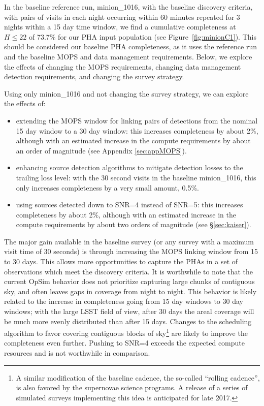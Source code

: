 In the baseline reference run, minion\_1016, with the baseline discovery criteria, with pairs of visits in each night occurring within 60 minutes repeated for 3 nights within a 15 day time window, we find a cumulative completeness at $H\le22$ of 73.7\% for our PHA input population (see Figure~\ref{fig:minionC1}). This should be considered our baseline PHA completeness, as it uses the reference run and the baseline MOPS and data management requirements. Below, we explore the effects of changing the MOPS requirements, changing data management detection requirements, and changing the survey strategy.

Using only minion\_1016 and not changing the survey strategy, we can explore the effects of:
\begin{itemize}
\item extending the MOPS window for linking pairs of detections from the nominal 15 day window to a 30 day window: this increases completeness by about 2\%, although with an estimated increase in the compute requirements by about an order of magnitude (see Appendix \ref{sec:appMOPS}).
\item enhancing source detection algorithms to mitigate detection losses to the trailing loss level: with the 30 second visits in the baseline minion\_1016, this only increases completeness by a very small amount, 0.5\%.
\item using sources detected down to SNR=4 instead of SNR=5: this increases completeness by about 2\%, although with an estimated increase in the compute requirements by about two orders of magnitude (see \S\ref{sec:kaiser}). 
\end{itemize}

The major gain available in the baseline survey (or any survey with a maximum visit time of 30 seconds) is through increasing the MOPS linking window from 15 to 30 days. This allows more opportunities to capture the PHAs in a set of observations which meet the discovery criteria. It is worthwhile to note that the current OpSim behavior does not prioritize capturing large chunks of contiguous sky, and often leaves gaps in coverage from night to night. This behavior is likely related to the increase in completeness going from 15 day windows to 30 day windows; with the large LSST field of view, after 30 days the areal coverage will be much more evenly distributed than after 15 days. Changes to the scheduling algorithm to favor covering contiguous blocks of sky\footnote{A similar modification of
the baseline cadence, the so-called ``rolling cadence'', is also favored by the supernovae science programs. A release of a series of simulated surveys implementing this idea is anticipated for late 2017.} are likely to improve the completeness even further.  Pushing to SNR=4 exceeds the expected compute resources and is not worthwhile in comparison.


